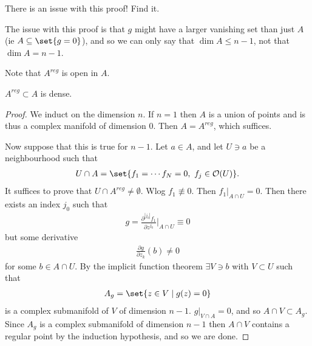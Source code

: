 \begin{exercise}
    There is an issue with this proof! Find it.
\end{exercise}

\begin{note}
    The issue with this proof is that $g$ might have a larger vanishing set than just $A$ (ie $A \subseteq \set{g=0}$), and so we can only say that $\dim A \leq n-1$, not that $\dim A = n-1$.
\end{note}

\begin{remark}
    Note that $A^{reg}$ is open in $A$.
\end{remark}

\begin{theorem}
    $A^{reg} \subset A$ is dense.
\end{theorem}

\begin{proof}
    We induct on the dimension $n$. If $n=1$ then $A$ is a union of points and is thus a complex manifold of dimension $0$. Then $A = A^{reg}$, which suffices.

    Now suppose that this is true for $n-1$. Let $a \in A$, and let $U \ni a$ be a neighbourhood such that
    \begin{align*}
        U \cap A = \set{f_1 = \cdots f_N = 0 , \,\, f_j \in \O(U)}.
    \end{align*}
    It suffices to prove that $U \cap A^{reg} \neq \emptyset$. Wlog $f_1 \not\equiv 0$. Then $f_1 |_{A \cap U} = 0$. Then there exists an index $j_0$ such that
    \begin{align*}
        g = \frac{\partial^{|j_0|} f_1}{\partial z^{j_0}} \bigg|_{A\cap U} \equiv 0
    \end{align*}
    but some derivative
    \begin{align*}
        \frac{\partial g}{\partial z_k} (b) \neq 0
    \end{align*}
    for some $b \in A \cap U$. By the implicit function theorem $\exists V \ni b$ with $V \subset U$ such that
    \begin{align*}
        A_g = \set{z \in V \mid g(z) = 0}
    \end{align*}
    is a complex submanifold of $V$ of dimension $n-1$. $g|_{V \cap A} = 0$, and so $A\cap V \subset A_g$. Since $A_g$ is a complex submanifold of dimension $n-1$ then $A \cap V$ contains a regular point by the induction hypothesis, and so we are done.
\end{proof}

